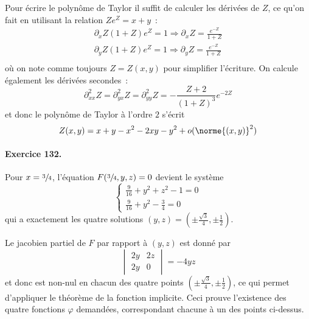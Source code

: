 Pour écrire le polynôme de Taylor il suffit de calculer les dérivées
de $Z$, ce qu'on fait en utilisant la relation $Z e^Z = x+y$~:
\begin{equation*}
\begin{split}
\partial_x Z (1 + Z) e^Z = 1 \Rightarrow \partial_x Z = \frac{e^{-Z}}{1+Z}\\
\partial_y Z (1 + Z) e^Z = 1 \Rightarrow \partial_y Z = \frac{e^{-Z}}{1+Z}\\
\end{split}
\end{equation*}
où on note comme toujours $Z = Z(x,y)$ pour simplifier l'écriture. On
calcule également les dérivées secondes~:
\begin{equation*}
\partial^2_{xx} Z = \partial^2_{yx} Z = \partial^2_{yy} Z =%
-\frac{Z+2}{(1+Z)^3} e^{-2 Z}
\end{equation*}
et donc le polynôme de Taylor à l'ordre $2$ s'écrit
\begin{equation*}
Z(x,y) = x + y - x^2 - 2 xy - y^2 + o(\norme{(x,y)}^2)
\end{equation*}

\paragraph{Exercice 132.}
Pour $x = \sfrac34$, l'équation $F(\sfrac34,y,z) = 0$ devient le
système
\begin{equation*}
\begin{cases}
\frac9{16} + y^2 + z^2 - 1 = 0\\
\frac9{16} + y^2 - \frac3{4} = 0
\end{cases}
\end{equation*}
qui a exactement les quatre solutions $(y,z) = (\pm
\frac{\sqrt3}4,\pm\frac12)$.

Le jacobien partiel de $F$ par rapport à $(y,z)$ est donné par
\begin{equation}\label{exo132-jacobienpartiel}\tag{*}
\begin{vmatrix}
2 y & 2z\\
2 y & 0
\end{vmatrix} = -4 y z
\end{equation}
et donc est non-nul en chacun des quatre points $(\pm
\frac{\sqrt3}4,\pm\frac12)$, ce qui permet d'appliquer le théorème de
la fonction implicite. Ceci prouve l'existence des quatre fonctions
$\varphi$ demandées, correspondant chacune à un des points ci-dessus.

